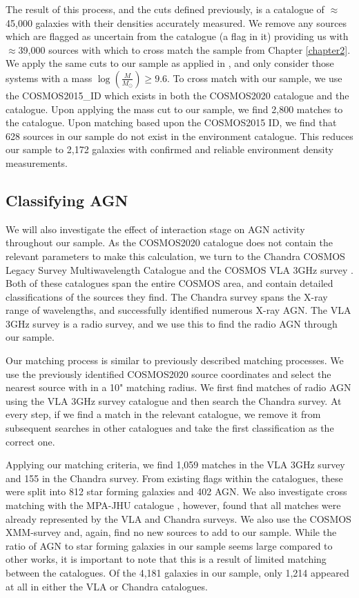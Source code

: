 The result of this process, and the cuts defined previously, is a catalogue of $\approx$45,000 galaxies with their densities accurately measured. We remove any sources which are flagged as uncertain from the catalogue (a flag in it) providing us with $\approx$39,000 sources with which to cross match the sample from Chapter \ref{chapter2}. We apply the same cuts to our sample as applied in \citet{2017ApJ...837...16D}, and only consider those systems with a mass $\log(\frac{M}{M_\odot}) \geq 9.6$. To cross match with our sample, we use the COSMOS2015\_ID which exists in both the COSMOS2020 catalogue and the \citet{2017ApJ...837...16D} catalogue. Upon applying the mass cut to our sample, we find 2,800 matches to the \citet{2017ApJ...837...16D} catalogue. Upon matching based upon the COSMOS2015 ID, we find that 628 sources in our sample do not exist in the environment catalogue. This reduces our sample to 2,172 galaxies with confirmed and reliable environment density measurements.

\subsection{Classifying AGN}\label{sec:agn-clsf}
\noindent We will also investigate the effect of interaction stage on AGN activity throughout our sample. As the COSMOS2020 catalogue does not contain the relevant parameters to make this calculation, we turn to the Chandra COSMOS Legacy Survey Multiwavelength Catalogue \citep{2016ApJ...817...34M} and the COSMOS VLA 3GHz survey \citep{2017A&A...602A...6S, 2017A&A...602A...3D}. Both of these catalogues span the entire COSMOS area, and contain detailed classifications of the sources they find. The Chandra survey spans the X-ray range of wavelengths, and successfully identified numerous X-ray AGN. The VLA 3GHz survey is a radio survey, and we use this to find the radio AGN through our sample. 

Our matching process is similar to previously described matching processes. We use the previously identified COSMOS2020 source coordinates and select the nearest source with in a 10" matching radius. We first find matches of radio AGN using the VLA 3GHz survey catalogue and then search the Chandra survey. At every step, if we find a match in the relevant catalogue, we remove it from subsequent searches in other catalogues and take the first classification as the correct one.

Applying our matching criteria, we find 1,059 matches in the VLA 3GHz survey and 155 in the Chandra survey. From existing flags within the catalogues, these were split into 812 star forming galaxies and 402 AGN. We also investigate cross matching with the MPA-JHU catalogue \citep{2003MNRAS.341...33K, 2004MNRAS.351.1151B, 2007ApJS..173..267S}, however, found that all matches were already represented by the VLA and Chandra surveys. We also use the COSMOS XMM-survey and, again, find no new sources to add to our sample. While the ratio of AGN to star forming galaxies in our sample seems large compared to other works, it is important to note that this is a result of limited matching between the catalogues. Of the 4,181 galaxies in our sample, only 1,214 appeared at all in either the VLA or Chandra catalogues.


